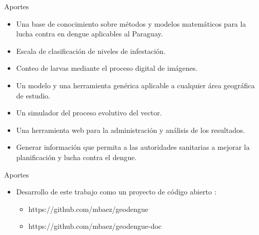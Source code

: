 \begin{frame}[c]{Aportes}
    \begin{itemize}
        \item Una base de conocimiento sobre métodos y modelos matemáticos para la lucha contra en dengue aplicables al Paraguay.
        \item Escala de clasificación de niveles de infestación.
        \item Conteo de larvas mediante el proceso digital de imágenes.
        \item Un modelo y una herramienta genérica aplicable a cualquier área geográfica de estudio.
        \item Un simulador del proceso evolutivo del vector.
        \item Una herramienta web para la administración y análisis de los resultados.
        \item Generar información que permita a las autoridades sanitarias a mejorar la planificación y lucha contra el dengue.
    \end{itemize}
\end{frame}
\begin{frame}[t]{Aportes}
    \begin{itemize}
        \item Desarrollo de este trabajo como un proyecto de código abierto :

        \begin{itemize}
            \item https://github.com/mbaez/geodengue
            \item https://github.com/mbaez/geodengue-doc
        \end{itemize}
    \end{itemize}
\end{frame}
